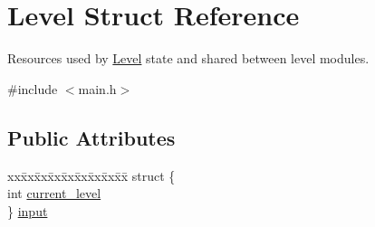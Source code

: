 \hypertarget{structLevel}{\section{Level Struct Reference}
\label{structLevel}
}


Resources used by \hyperlink{structLevel}{Level} state and shared between level modules.  




{\ttfamily \#include $<$main.\-h$>$}

\subsection*{Public Attributes}
\begin{DoxyCompactItemize}
\item 
\begin{tabbing}
xx\=xx\=xx\=xx\=xx\=xx\=xx\=xx\=xx\=\kill
struct \{\\
\>int \hyperlink{structLevel_a1ba3ee0104c912dde5d6e70fee889512}{current\_level}\\
\} \hyperlink{structLevel_a238f3f47a5598d7150c6bba03b4f6dda}{input}\\


\end{tabbing}
\end{DoxyCompactItemize}
